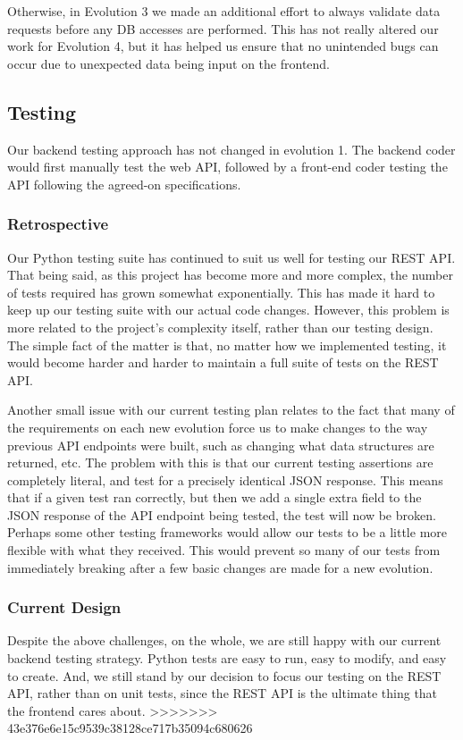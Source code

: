 \documentclass[12pt]{article}
\begin{document}
Otherwise, in Evolution 3 we made an additional effort to always validate data requests before any DB accesses are performed. This has not really altered our work for Evolution 4, but it has helped us ensure that no unintended bugs can occur due to unexpected data being input on the frontend. 

\subsection{Testing}

Our backend testing approach has not changed in evolution 1. The backend coder would first manually test the web API, followed by a front-end coder testing the API following the agreed-on specifications. 

\subsubsection{Retrospective}
Our Python testing suite has continued to suit us well for testing our REST API. That being said, as this project has become more and more complex, the number of tests required has grown somewhat exponentially. This has made it hard to keep up our testing suite with our actual code changes. However, this problem is more related to the project's complexity itself, rather than our testing design. The simple fact of the matter is that, no matter how we implemented testing, it would become harder and harder to maintain a full suite of tests on the REST API. 

Another small issue with our current testing plan relates to the fact that many of the requirements on each new evolution force us to make changes to the way previous API endpoints were built, such as changing what data structures are returned, etc. The problem with this is that our current testing assertions are completely literal, and test for a precisely identical JSON response. This means that if a given test ran correctly, but then we add a single extra field to the JSON response of the API endpoint being tested, the test will now be broken. Perhaps some other testing frameworks would allow our tests to be a little more flexible with what they received. This would prevent so many of our tests from immediately breaking after a few basic changes are made for a new evolution. 

\subsubsection{Current Design}
Despite the above challenges, on the whole, we are still happy with our current backend testing strategy. Python tests are easy to run, easy to modify, and easy to create. And, we still stand by our decision to focus our testing on the REST API, rather than on unit tests, since the REST API is the ultimate thing that the frontend cares about.
>>>>>>> 43e376e6e15c9539c38128ce717b35094c680626
\end{document}
